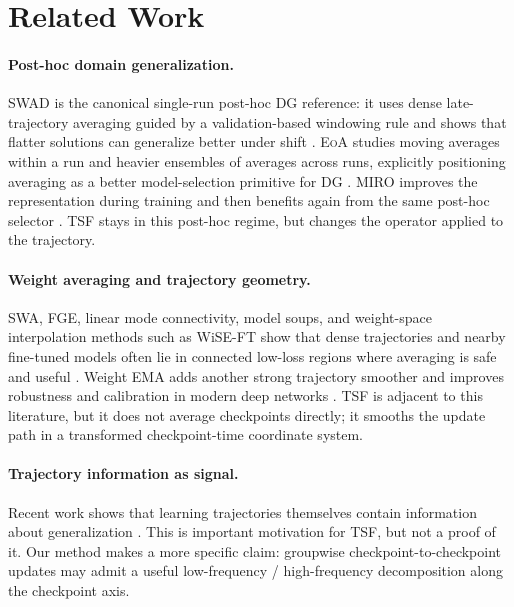 \documentclass{article}
\newcommand{\tsf}{\textup{\textsc{TSF}}}
\newcommand{\swad}{\textup{\textsc{SWAD}}}
\newcommand{\eoa}{\textup{\textsc{EoA}}}
\newcommand{\miro}{\textup{\textsc{MIRO}}}
\begin{document}
\section{Related Work}

\paragraph{Post-hoc domain generalization.}
\swad{} is the canonical single-run post-hoc DG reference: it uses dense late-trajectory averaging guided by a validation-based windowing rule and shows that flatter solutions can generalize better under shift \citep{cha2021swad}. \eoa{} studies moving averages within a run and heavier ensembles of averages across runs, explicitly positioning averaging as a better model-selection primitive for DG \citep{arpit2022eoa}. \miro{} improves the representation during training and then benefits again from the same post-hoc selector \citep{cha2022miro}. \tsf{} stays in this post-hoc regime, but changes the operator applied to the trajectory.

\paragraph{Weight averaging and trajectory geometry.}
SWA, FGE, linear mode connectivity, model soups, and weight-space interpolation methods such as WiSE-FT show that dense trajectories and nearby fine-tuned models often lie in connected low-loss regions where averaging is safe and useful \citep{izmailov2018swa,garipov2018fge,frankle2020linear,wortsman2022soups,wortsman2022wiseft}. Weight EMA adds another strong trajectory smoother and improves robustness and calibration in modern deep networks \citep{moralesbrotons2024ema}. \tsf{} is adjacent to this literature, but it does not average checkpoints directly; it smooths the update path in a transformed checkpoint-time coordinate system.

\paragraph{Trajectory information as signal.}
Recent work shows that learning trajectories themselves contain information about generalization \citep{fu2023trajectory}. This is important motivation for \tsf{}, but not a proof of it. Our method makes a more specific claim: groupwise checkpoint-to-checkpoint updates may admit a useful low-frequency / high-frequency decomposition along the checkpoint axis.
\end{document}
